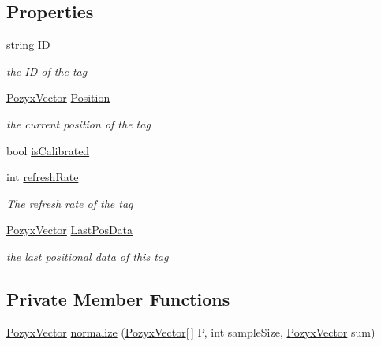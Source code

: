 \subsection*{Properties}
\begin{DoxyCompactItemize}
\item 
string \hyperlink{class_pozyx_positioner_1_1_framework_1_1_tag_a0d75eeca4dea7088e2b4a60230c13012}{ID}
\begin{DoxyCompactList}\small\item\em the ID of the tag \end{DoxyCompactList}\item 
\hyperlink{struct_pozyx_positioner_1_1_framework_1_1_pozyx_vector}{Pozyx\+Vector} \hyperlink{class_pozyx_positioner_1_1_framework_1_1_tag_a0b1b836b4e64ae70171587a2bcde4d71}{Position}
\begin{DoxyCompactList}\small\item\em the current position of the tag \end{DoxyCompactList}\item 
bool \hyperlink{class_pozyx_positioner_1_1_framework_1_1_tag_a02cdde9c3303a18f28453056939bf045}{is\+Calibrated}
\item 
int \hyperlink{class_pozyx_positioner_1_1_framework_1_1_tag_a9010e57016df0a932c5ce8f8584ff5f9}{refresh\+Rate}
\begin{DoxyCompactList}\small\item\em The refresh rate of the tag \end{DoxyCompactList}\item 
\hyperlink{struct_pozyx_positioner_1_1_framework_1_1_pozyx_vector}{Pozyx\+Vector} \hyperlink{class_pozyx_positioner_1_1_framework_1_1_tag_ac60d7ebc6171c464cd77e81aae36cacc}{Last\+Pos\+Data}
\begin{DoxyCompactList}\small\item\em the last positional data of this tag \end{DoxyCompactList}\end{DoxyCompactItemize}
\subsection*{Private Member Functions}
\begin{DoxyCompactItemize}
\item 
\hyperlink{struct_pozyx_positioner_1_1_framework_1_1_pozyx_vector}{Pozyx\+Vector} \hyperlink{class_pozyx_positioner_1_1_framework_1_1_tag_ad660c4234e2e962b72737bff03665df9}{normalize} (\hyperlink{struct_pozyx_positioner_1_1_framework_1_1_pozyx_vector}{Pozyx\+Vector}\mbox{[}$\,$\mbox{]} P, int sample\+Size, \hyperlink{struct_pozyx_positioner_1_1_framework_1_1_pozyx_vector}{Pozyx\+Vector} sum)
\end{DoxyCompactItemize}
